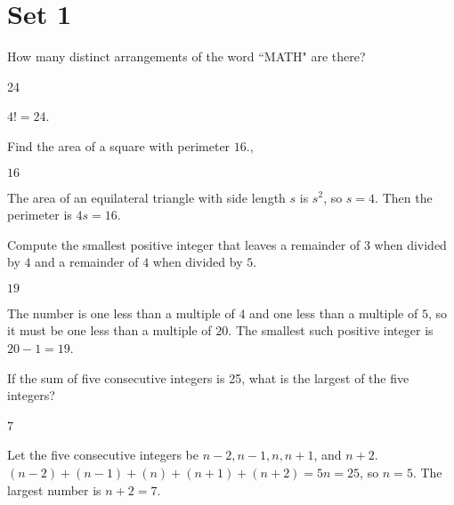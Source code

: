 \documentclass[11pt]{article}
\begin{document}
\section*{Set 1}

\begin{problem}%
How many distinct arrangements of the word ``MATH" are there?
\end{problem}

\begin{answer}
24
\end{answer}

\begin{solution}	
$4! = 24$.
\end{solution}


\begin{problem}
Find the area of a square with perimeter $16$.,
\end{problem}

\begin{answer}
$16$
\end{answer}

\begin{solution}
The area of an equilateral triangle with side length $s$ is $s^2$, so $s = 4$. Then the perimeter is $4s = 16$.
\end{solution}


\begin{problem}
Compute the smallest positive integer that leaves a remainder of $3$ when divided by $4$ and a remainder of $4$ when divided by $5$.
\end{problem}

\begin{answer}
$19$
\end{answer}

\begin{solution}
The number is one less than a multiple of $4$ and one less than a multiple of $5$, so it must be one less than a multiple of $20$. The smallest such positive integer is $20 - 1 = 19$.
\end{solution}


\begin{problem}%
If the sum of five consecutive integers is 25, what is the largest of the five integers?
\end{problem}

\begin{answer}
7
\end{answer}
	
\begin{solution}
Let the five consecutive integers be $n-2, n-1, n, n+1$, and $n+2$. $(n-2)+(n-1)+(n)+(n+1)+(n+2) = 5n = 25$, so $n=5$. The largest number is $n+2 = 7$.
\end{solution}
\end{document}
